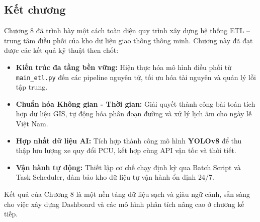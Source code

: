 \subsection{Kết chương}

Chương 8 đã trình bày một cách toàn diện quy trình xây dựng hệ thống ETL – trung tâm điều phối của kho dữ liệu giao thông thông minh. Chương này đã đạt được các kết quả kỹ thuật then chốt:

\begin{itemize}
    \item \textbf{Kiến trúc đa tầng bền vững:} Hiện thực hóa mô hình điều phối từ \texttt{main\_etl.py} đến các pipeline nguyên tử, tối ưu hóa tài nguyên và quản lý lỗi tập trung.
    \item \textbf{Chuẩn hóa Không gian - Thời gian:} Giải quyết thành công bài toán tích hợp dữ liệu GIS, tự động hóa phân đoạn đường và xử lý lịch âm cho ngày lễ Việt Nam.
    \item \textbf{Hợp nhất dữ liệu AI:} Tích hợp thành công mô hình \textbf{YOLOv8} để thu thập lưu lượng xe quy đổi PCU, kết hợp cùng API vận tốc và thời tiết.
    \item \textbf{Vận hành tự động:} Thiết lập cơ chế chạy định kỳ qua Batch Script và Task Scheduler, đảm bảo kho dữ liệu tự vận hành ổn định 24/7.
\end{itemize}

Kết quả của Chương 8 là một nền tảng dữ liệu sạch và giàu ngữ cảnh, sẵn sàng cho việc xây dựng Dashboard và các mô hình phân tích nâng cao ở chương kế tiếp.
